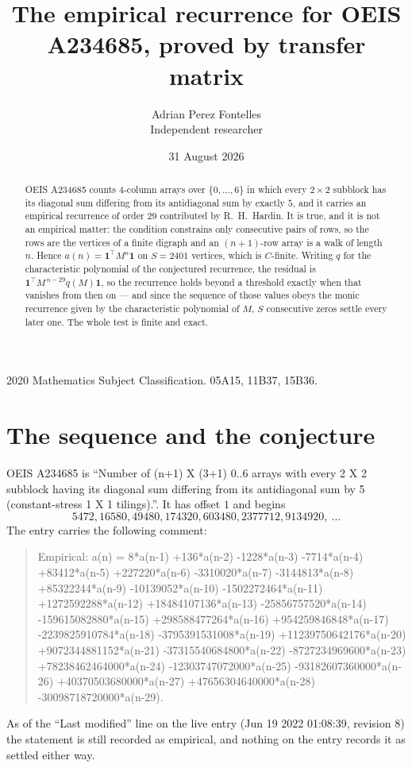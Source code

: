 \documentclass[11pt,a4paper]{article}
\title{The empirical recurrence for OEIS A234685, proved by transfer matrix}
\author{Adrian Perez Fontelles\\ \small Independent researcher}
\date{31 August 2026}
\theoremstyle{plain}
\theoremstyle{definition}
\begin{document}
\maketitle

\begin{abstract}
OEIS A234685 counts $4$-column arrays over $\{0,\dots,6\}$ in which every
$2\times2$ subblock has its diagonal sum differing from its antidiagonal sum by
exactly $5$, and it
carries an empirical recurrence of order $29$ contributed by R.~H.~Hardin. It is true,
and it is not an empirical matter: the condition constrains only consecutive pairs of rows,
so the rows are the vertices of a finite digraph and an $(n+1)$-row array is a walk of
length $n$. Hence $a(n)=\mathbf{1}^{\!\top}M^{n}\mathbf{1}$ on $S=2401$ vertices, which
is $C$-finite. Writing $q$ for the characteristic polynomial of the conjectured recurrence,
the residual is $\mathbf{1}^{\!\top}M^{\,n-29}q(M)\mathbf{1}$, so the recurrence
holds beyond a threshold exactly when that vanishes from then on --- and since the sequence
of those values obeys the monic recurrence given by the characteristic polynomial of $M$,
$S$ consecutive zeros settle every later one. The whole test is finite and exact.
\end{abstract}

\noindent\small 2020 Mathematics Subject Classification. 05A15, 11B37, 15B36.\normalsize

\section{The sequence and the conjecture}

OEIS A234685 is ``Number of (n+1) X (3+1) 0..6 arrays with every 2 X 2 subblock having its diagonal sum differing from its antidiagonal sum by 5 (constant-stress 1 X 1 tilings).''. It has offset
$1$ and begins
\[
5472, 16580, 49480, 174320, 603480, 2377712, 9134920,\ \dots
\]
The entry carries the following comment:
\begin{quote}\small
Empirical: a(n) = 8*a(n-1) +136*a(n-2) -1228*a(n-3) -7714*a(n-4) +83412*a(n-5) +227220*a(n-6) -3310020*a(n-7) -3144813*a(n-8) +85322244*a(n-9) -10139052*a(n-10) -1502272464*a(n-11) +1272592288*a(n-12) +18484107136*a(n-13) -25856757520*a(n-14) -159615082880*a(n-15) +298588477264*a(n-16) +954259846848*a(n-17) -2239825910784*a(n-18) -3795391531008*a(n-19) +11239750642176*a(n-20) +9072344881152*a(n-21) -37315540684800*a(n-22) -8727234969600*a(n-23) +78238462464000*a(n-24) -12303747072000*a(n-25) -93182607360000*a(n-26) +40370503680000*a(n-27) +47656304640000*a(n-28) -30098718720000*a(n-29).
\end{quote}
As of the ``Last modified'' line on the live entry (Jun 19 2022 01:08:39, revision 8) the statement is
still recorded as empirical, and nothing on the entry records it as settled either way.
\end{document}
